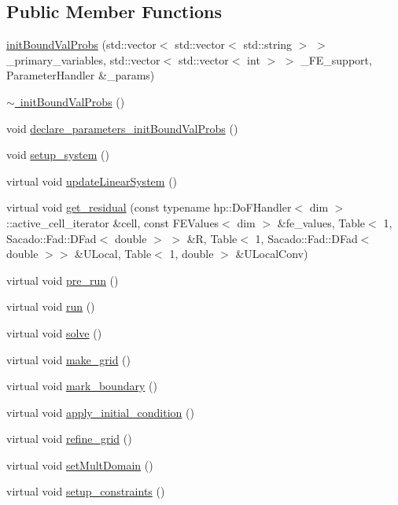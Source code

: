 \subsection*{Public Member Functions}
\begin{DoxyCompactItemize}
\item 
\mbox{\hyperlink{classinit_bound_val_probs_af836a88e7f9df1d43d6f93c4747858fe}{init\+Bound\+Val\+Probs}} (std\+::vector$<$ std\+::vector$<$ std\+::string $>$ $>$ \+\_\+primary\+\_\+variables, std\+::vector$<$ std\+::vector$<$ int $>$ $>$ \+\_\+\+F\+E\+\_\+support, Parameter\+Handler \&\+\_\+params)
\item 
\mbox{\hyperlink{classinit_bound_val_probs_a56066f199b4a30dfd060e6e1b0a78c03}{$\sim$ init\+Bound\+Val\+Probs}} ()
\item 
void \mbox{\hyperlink{classinit_bound_val_probs_af60fa8844da68c0cd887b300855c086c}{declare\+\_\+parameters\+\_\+init\+Bound\+Val\+Probs}} ()
\item 
void \mbox{\hyperlink{classinit_bound_val_probs_a8f0c6272cf214048329d7cf1aa58b860}{setup\+\_\+system}} ()
\item 
virtual void \mbox{\hyperlink{classinit_bound_val_probs_af78c2c6284234c93872188334fb997d8}{update\+Linear\+System}} ()
\item 
virtual void \mbox{\hyperlink{classinit_bound_val_probs_ac8f2c3e2a1040c70b709900dc3dfdaea}{get\+\_\+residual}} (const typename hp\+::\+Do\+F\+Handler$<$ dim $>$\+::active\+\_\+cell\+\_\+iterator \&cell, const F\+E\+Values$<$ dim $>$ \&fe\+\_\+values, Table$<$ 1, Sacado\+::\+Fad\+::\+D\+Fad$<$ double $>$ $>$ \&R, Table$<$ 1, Sacado\+::\+Fad\+::\+D\+Fad$<$ double $>$$>$ \&U\+Local, Table$<$ 1, double $>$ \&U\+Local\+Conv)
\item 
virtual void \mbox{\hyperlink{classinit_bound_val_probs_a7a8df3f99e1d582c6c136b16d6e34d13}{pre\+\_\+run}} ()
\item 
virtual void \mbox{\hyperlink{classinit_bound_val_probs_a13a43e6d814de94978c515cb084873b1}{run}} ()
\item 
virtual void \mbox{\hyperlink{classinit_bound_val_probs_af7d39f0eac0af0ed5785935ac72a1e7d}{solve}} ()
\item 
virtual void \mbox{\hyperlink{classinit_bound_val_probs_aadd4943e52767516f3f7c5460ea35032}{make\+\_\+grid}} ()
\item 
virtual void \mbox{\hyperlink{classinit_bound_val_probs_a7ed791f6f2c777286743182bf2f481bf}{mark\+\_\+boundary}} ()
\item 
virtual void \mbox{\hyperlink{classinit_bound_val_probs_a8d32e81a32f1aaf5682065458548e8e2}{apply\+\_\+initial\+\_\+condition}} ()
\item 
virtual void \mbox{\hyperlink{classinit_bound_val_probs_aea55077652a6fc58f1c0c250c4abd856}{refine\+\_\+grid}} ()
\item 
virtual void \mbox{\hyperlink{classinit_bound_val_probs_a5fb25d0981afa1f7d87875fffcc272c1}{set\+Mult\+Domain}} ()
\item 
virtual void \mbox{\hyperlink{classinit_bound_val_probs_a97967f7bc5aba9a2158464d2de9d2352}{setup\+\_\+constraints}} ()
\end{DoxyCompactItemize}
